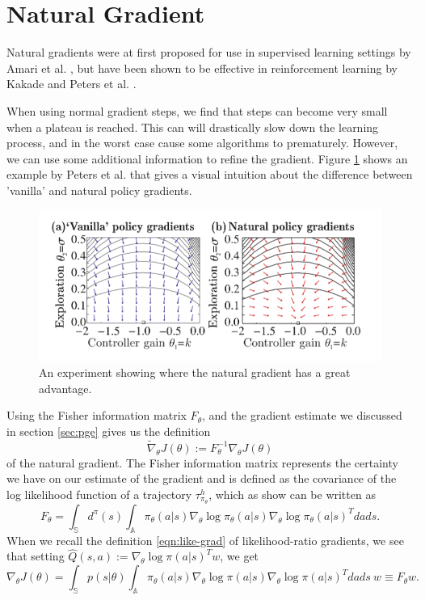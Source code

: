 \section{Natural Gradient}
\label{sec:natural}

Natural gradients were at first proposed for use in supervised learning settings by Amari et al. \cite{Amari:1998:NGW:287476.287477}, but have been shown to be effective in reinforcement learning by Kakade \cite{Kakade:2001} and Peters et al. \cite{4863}.

When using normal gradient steps, we find that steps can become very small when a plateau is reached. 
This can will drastically slow down the learning process, and in the worst case cause some algorithms to prematurely. 
However, we can use some additional information to refine the gradient. 
Figure \ref{fig:nat-grad-adv} shows an example by Peters et al. \cite{Peters_IICHR_2003} that gives a visual intuition about the difference between 'vanilla' and natural policy gradients. 

\begin{figure}
  \includegraphics[width=\textwidth]{nat-grad-adv}
  \caption{An experiment showing where the natural gradient has a great advantage. \cite{Peters_IICHR_2003} }\label{fig:nat-grad-adv}
\end{figure}

Using the Fisher information matrix $F_\theta$, and the gradient estimate we discussed in section \ref{sec:pge} gives us the definition
\begin{equation}
  \widetilde{\nabla}_\theta J(\theta) := F^{-1}_\theta \nabla_\theta J(\theta)
  \label{eqn:nat-grad}
\end{equation}
of the natural gradient. 
The Fisher information matrix represents the certainty we have on our estimate of the gradient and is defined as the covariance of the log likelihood function of a trajectory $\tau_{\pi_\theta}^h$, which as \cite{4863} show can be written as 
\begin{equation}
  F_\theta = \int_\mathbb{S} d^\pi(s) \int_\mathbb{A} \pi_\theta(a|s) \nabla_\theta \log{\pi_\theta(a|s)} \nabla_\theta \log{\pi_\theta(a|s)}^T dads.
  \label{eqn:F}
\end{equation}
When we recall the definition \eqref{eqn:like-grad} of likelihood-ratio gradients, we see that setting $\hat{Q}(s,a) := \nabla_\theta \log \pi(a|s)^T w$, we get
\begin{equation}
  \nabla_\theta J(\theta) = \int_\mathbb{S} {p(s|\theta) \int_\mathbb{A} \pi_\theta(a|s) \nabla_\theta \log \pi(a|s) {\nabla_\theta \log \pi(a|s)}^T dads}\ w \equiv F_\theta w.
  \label{eqn:J-equals-F}
\end{equation}

